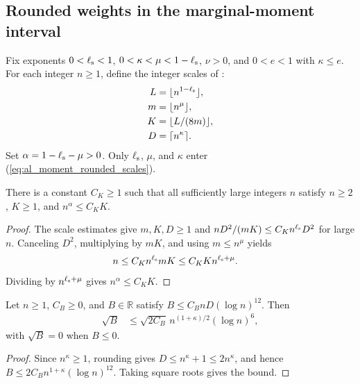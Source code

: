 \subsection{Rounded weights in the marginal-moment interval}

Fix exponents $0<\ell_{\rm s}<1$, $0<\kappa<\mu<1-\ell_{\rm s}$,
$\nu>0$, and $0<e<1$ with $\kappa\le e$. For each integer $n\ge1$, define
the integer scales of \cite[Section~9, lines~32--41]{OpenAI2026AreaLaw}:
\begin{align}
    L & =\lfloor n^{1-\ell_{\rm s}}\rfloor, \\
    m & =\lfloor n^\mu\rfloor,              \\
    K & =\lfloor L/(8m)\rfloor,             \\
    D & =\lceil n^\kappa\rceil.
    \label{eq:al_moment_rounded_scales}
\end{align}
Set $\alpha=1-\ell_{\rm s}-\mu>0$. Only $\ell_{\rm s}$, $\mu$, and $\kappa$ enter
(\ref{eq:al_moment_rounded_scales}).

\begin{lemma}
    \label{thm:al_moment_band_power}
    \leanok
    There is a constant $C_K\ge1$ such that all sufficiently large
    integers $n$ satisfy $n\ge2$, $K\ge1$, and $n^\alpha\le C_KK$.
\end{lemma}
\begin{proof}\leanok
    The scale estimates give $m,K,D\ge 1$ and
    $nD^2/(mK)\le C_Kn^{\ell_{\rm s}}D^2$ for large $n$.
    Canceling $D^2$, multiplying by $mK$, and using $m\le n^\mu$ yields
    \begin{align}
        n & \le C_Kn^{\ell_{\rm s}}mK
        \le C_KK n^{\ell_{\rm s}+\mu}.
    \end{align}
    Dividing by $n^{\ell_{\rm s}+\mu}$ gives $n^\alpha\le C_K K$.
\end{proof}

\begin{lemma}
    \label{thm:al_moment_sqrt_budget}
    \leanok
    Let $n\ge1$, $C_B\ge0$, and $B\in\mathbb R$ satisfy
    $B\le C_BnD(\log n)^{12}$. Then
    \begin{align}
        \sqrt B & \le\sqrt{2C_B}\,n^{(1+\kappa)/2}(\log n)^6,
    \end{align}
    with $\sqrt B = 0$ when $B\le 0$.
\end{lemma}
\begin{proof}\leanok
    Since $n^\kappa\ge1$, rounding gives
    $D\le n^\kappa+1\le2n^\kappa$, and hence
    $B\le2C_Bn^{1+\kappa}(\log n)^{12}$. Taking square roots gives the bound.
\end{proof}

